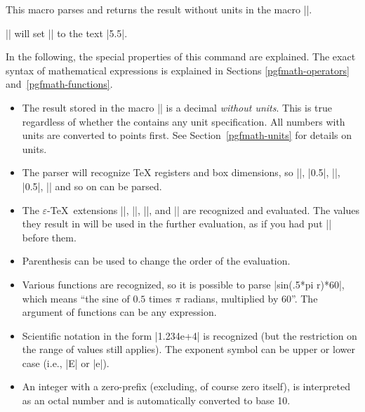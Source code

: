 \begin{command}{\pgfmathparse{}}
  This macro parses  and returns the result without
  units in  the macro |\pgfmathresult|.

  \example |\pgfmathparse{2pt+3.5pt}| will set |\pgfmathresult| to the
  text |5.5|.

  In the following, the special properties of this command are
  explained. The exact syntax of mathematical expressions is explained
  in Sections \ref{pgfmath-operators} and~\ref{pgfmath-functions}.

  \begin{itemize}
  \item
    The result stored in the macro |\pgfmathresult| is a decimal
    \emph{without units}. This is true regardless of whether the
     contains any unit specification. All numbers
    with units are converted to points first. See
    Section~\ref{pgfmath-units} for details on units.
  \item
    The parser will recognize \TeX{} registers and box dimensions,
    so |\mydimen|, |0.5\mydimen|, |\wd\mybox|, |0.5\dp\mybox|,
    |\mycount\mydimen| and so on can be parsed.
    
  \item
    The $\varepsilon$-TeX\ extensions |\dimexpr|, |\numexpr|, |\glueexpr|, and
    |\muexpr| are recognized and evaluated. The values they
    result in will be used in the further evaluation, as if you had
    put |\the| before them. 
    
  \item
    Parenthesis can be used to change the order of the evaluation.
    
  \item
    Various functions are recognized, so it is possible to parse
    |sin(.5*pi r)*60|, which means ``the sine of $0.5$ times $\pi$
    radians, multiplied by 60''. The argument of functions can
    be any expression.
    
  \item
    Scientific notation in the form |1.234e+4| is recognized (but
    the restriction on the range of values still applies). The exponent
    symbol can be upper or lower case (i.e., |E| or |e|).
    
  \item
    An integer with a zero-prefix (excluding, of course zero itself),
    is interpreted as an octal number and is automatically converted
    to base 10.
    

\end{itemize}
\end{command}
